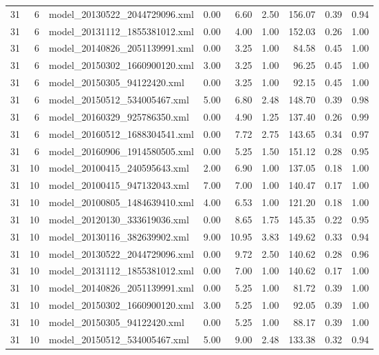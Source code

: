 \begin{table}[ht]
\begin{tabular}{rrlrrrrrr}
   31 &   6 & model\_20130522\_2044729096.xml & 0.00 & 6.60 & 2.50 & 156.07 & 0.39 & 0.94 \\ 
   31 &   6 & model\_20131112\_1855381012.xml & 0.00 & 4.00 & 1.00 & 152.03 & 0.26 & 1.00 \\ 
   31 &   6 & model\_20140826\_2051139991.xml & 0.00 & 3.25 & 1.00 & 84.58 & 0.45 & 1.00 \\ 
   31 &   6 & model\_20150302\_1660900120.xml & 3.00 & 3.25 & 1.00 & 96.25 & 0.45 & 1.00 \\ 
   31 &   6 & model\_20150305\_94122420.xml & 0.00 & 3.25 & 1.00 & 92.15 & 0.45 & 1.00 \\ 
   31 &   6 & model\_20150512\_534005467.xml & 5.00 & 6.80 & 2.48 & 148.70 & 0.39 & 0.98 \\ 
   31 &   6 & model\_20160329\_925786350.xml & 0.00 & 4.90 & 1.25 & 137.40 & 0.26 & 0.99 \\ 
   31 &   6 & model\_20160512\_1688304541.xml & 0.00 & 7.72 & 2.75 & 143.65 & 0.34 & 0.97 \\ 
   31 &   6 & model\_20160906\_1914580505.xml & 0.00 & 5.25 & 1.50 & 151.12 & 0.28 & 0.95 \\ 
   31 &  10 & model\_20100415\_240595643.xml & 2.00 & 6.90 & 1.00 & 137.05 & 0.18 & 1.00 \\ 
   31 &  10 & model\_20100415\_947132043.xml & 7.00 & 7.00 & 1.00 & 140.47 & 0.17 & 1.00 \\ 
   31 &  10 & model\_20100805\_1484639410.xml & 4.00 & 6.53 & 1.00 & 121.20 & 0.18 & 1.00 \\ 
   31 &  10 & model\_20120130\_333619036.xml & 0.00 & 8.65 & 1.75 & 145.35 & 0.22 & 0.95 \\ 
   31 &  10 & model\_20130116\_382639902.xml & 9.00 & 10.95 & 3.83 & 149.62 & 0.33 & 0.94 \\ 
   31 &  10 & model\_20130522\_2044729096.xml & 0.00 & 9.72 & 2.50 & 140.62 & 0.28 & 0.96 \\ 
   31 &  10 & model\_20131112\_1855381012.xml & 0.00 & 7.00 & 1.00 & 140.62 & 0.17 & 1.00 \\ 
   31 &  10 & model\_20140826\_2051139991.xml & 0.00 & 5.25 & 1.00 & 81.72 & 0.39 & 1.00 \\ 
   31 &  10 & model\_20150302\_1660900120.xml & 3.00 & 5.25 & 1.00 & 92.05 & 0.39 & 1.00 \\ 
   31 &  10 & model\_20150305\_94122420.xml & 0.00 & 5.25 & 1.00 & 88.17 & 0.39 & 1.00 \\ 
   31 &  10 & model\_20150512\_534005467.xml & 5.00 & 9.00 & 2.48 & 133.38 & 0.32 & 0.94 \\ 

\end{tabular}
\end{table}
